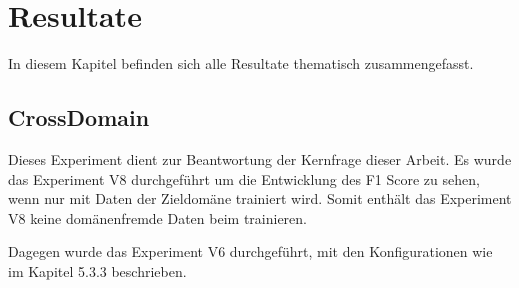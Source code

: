 \chapter{Resultate}
In diesem Kapitel befinden sich alle Resultate thematisch zusammengefasst.

\section{CrossDomain}
Dieses Experiment dient zur Beantwortung der Kernfrage dieser Arbeit. Es wurde das Experiment V8 durchgeführt um die Entwicklung des F1 Score zu sehen, wenn nur mit Daten der Zieldomäne trainiert wird. Somit enthält das Experiment V8 keine domänenfremde Daten beim trainieren.

Dagegen wurde das Experiment V6 durchgeführt, mit den Konfigurationen wie im Kapitel 5.3.3 beschrieben.

